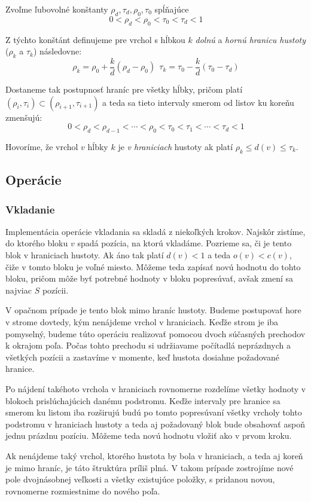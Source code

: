 Zvoľme ľubovolné konštanty $\rho_d, \tau_d, \rho_0, \tau_0$ spĺňajúce
\[
0 < \rho_d < \rho_0 < \tau_0 < \tau_d < 1
\]

Z týchto konštánt definujeme pre vrchol s hĺbkou $k$ \emph{dolnú} a \emph{hornú hranicu hustoty} ($\rho_k$ a $\tau_k$) následovne:
\[
\rho_k = \rho_0 + \frac{k}{d}(\rho_d-\rho_0) ~~
\tau_k = \tau_0 - \frac{k}{d}(\tau_0-\tau_d)
\]

Dostaneme tak postupnosť hraníc pre všetky hĺbky, pričom platí $(\rho_i,\tau_i) \subset (\rho_{i+1},\tau_{i+1})$ a teda sa tieto intervaly smerom od listov ku koreňu zmenšujú:
\[
0 < \rho_d < \rho_{d-1} < \cdots < \rho_0 < \tau_0 < \tau_1 < \cdots < \tau_d < 1
\]

Hovoríme, že vrchol $v$ hĺbky $k$ je \emph{v hraniciach} hustoty ak platí $\rho_k \le d(v) \le \tau_k$.

\subsection{Operácie}
\subsubsection{Vkladanie}

Implementácia operácie vkladania sa skladá z niekoľkých krokov. Najskôr zistíme, do ktorého bloku $v$ spadá pozícia, na ktorú vkladáme. Pozrieme sa, či je tento blok v hraniciach hustoty. Ak áno tak platí $d(v) < 1$ a teda $o(v) < c(v)$, čiže v tomto bloku je voľné miesto. Môžeme teda zapísať novú hodnotu do tohto bloku, pričom môže byť potrebné hodnoty v bloku popresúvať, avšak zmení sa najviac $S$ pozícii.

V opačnom prípade je tento blok mimo hraníc hustoty. Budeme postupovať hore v strome dovtedy, kým nenájdeme vrchol v hraniciach. Keďže strom je iba pomyselný, budeme túto operáciu realizovať pomocou dvoch súčasných prechodov k okrajom poľa. Počas tohto prechodu si udržiavame počítadlá neprázdnych a všetkých pozícii a zastavíme v momente, keď hustota dosiahne požadované hranice.

Po nájdení takéhoto vrchola v hraniciach rovnomerne rozdelíme všetky hodnoty v blokoch prislúchajúcich danému podstromu. Keďže intervaly pre hranice sa smerom ku listom iba rozširujú budú po tomto popresúvaní všetky vrcholy tohto podstromu v hraniciach hustoty a teda aj požadovaný blok bude obsahovať aspoň jednu prázdnu pozíciu. Môžeme teda novú hodnotu vložiť ako v prvom kroku.

Ak nenájdeme taký vrchol, ktorého hustota by bola v hraniciach, a teda aj koreň je mimo hraníc, je táto štruktúra príliš plná. V takom prípade zostrojíme nové pole dvojnásobnej veľkosti a všetky existujúce položky, s pridanou novou, rovnomerne rozmiestnime do nového poľa.

